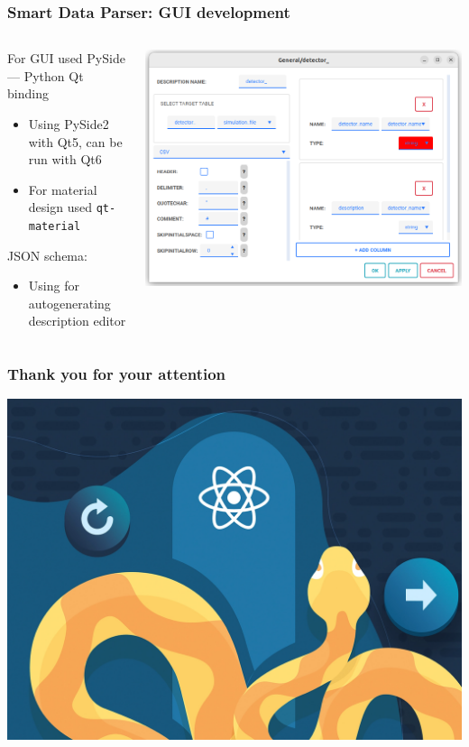 \documentclass[8pt,pdf,hyperref={unicode}]{beamer}
\begin{document}
\begin{frame}
	\frametitle{Smart Data Parser: GUI development}
	\begin{columns}
		\begin{column}{0.5\linewidth}
			For GUI used PySide\footnotemark --- Python Qt binding
			\begin{itemize}
				\item Using PySide2 with Qt5, can be run with Qt6
				\item For material design used \texttt{qt-material}\footnotemark 
			\end{itemize}
			JSON schema:
			\begin{itemize}
				\item Using for autogenerating description editor
			\end{itemize}
		\end{column}

		\begin{column}{0.5\linewidth}
		\includegraphics[width=\linewidth]{image/gui2.png}
		\end{column}
	\end{columns}
\end{frame}
\begin{frame}
	\frametitle{Thank you for your attention}

	\includegraphics[width=\linewidth]{image/python.png}

\end{frame}
\end{document}
